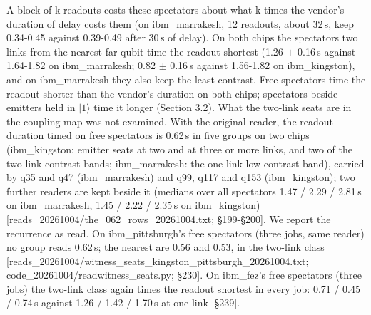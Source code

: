 \documentclass[11pt]{article}
\begin{document}
\par\smallskip\noindent{}\par\smallskip
A block of k readouts costs these spectators about what k times the vendor's duration of delay costs them (on ibm\_marrakesh, 12 readouts, about 32\,\textmu s, keep 0.34-0.45 against 0.39-0.49 after 30\,\textmu s of delay). On both chips the spectators two links from the nearest far qubit time the readout shortest (1.26 \(\pm\) 0.16\,\textmu s against 1.64-1.82 on ibm\_marrakesh; 0.82 \(\pm\) 0.16\,\textmu s against 1.56-1.82 on ibm\_kingston), and on ibm\_marrakesh they also keep the least contrast. Free spectators time the readout shorter than the vendor's duration on both chips; spectators beside emitters held in \(|1\rangle\) time it longer (Section 3.2). What the two-link seats are in the coupling map was not examined. With the original reader, the readout duration timed on free spectators is 0.62\,\textmu s in five groups on two chips (ibm\_kingston: emitter seats at two and at three or more links, and two of the two-link contrast bands; ibm\_marrakesh: the one-link low-contrast band), carried by q35 and q47 (ibm\_marrakesh) and q99, q117 and q153 (ibm\_kingston); two further readers are kept beside it (medians over all spectators 1.47 / 2.29 / 2.81\,\textmu s on ibm\_marrakesh, 1.45 / 2.22 / 2.35\,\textmu s on ibm\_kingston) {[}reads\_20261004/the\_062\_rows\_20261004.txt; \S{}199-\S{}200{]}. We report the recurrence as read. On ibm\_pittsburgh's free spectators (three jobs, same reader) no group reads 0.62\,\textmu s; the nearest are 0.56 and 0.53, in the two-link class {[}reads\_20261004/witness\_seats\_kingston\_pittsburgh\_20261004.txt; code\_20261004/readwitness\_seats.py; \S{}230{]}. On ibm\_fez's free spectators (three jobs) the two-link class again times the readout shortest in every job: 0.71 / 0.45 / 0.74\,\textmu s against 1.26 / 1.42 / 1.70\,\textmu s at one link {[}\S{}239{]}.
\end{document}
